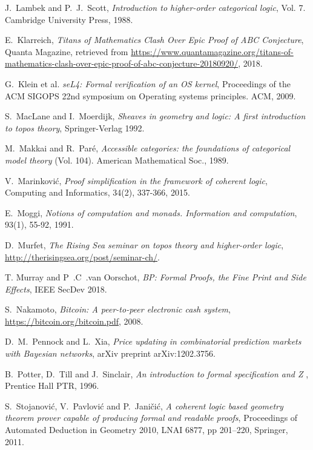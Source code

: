 \documentclass[english,letter paper,12pt,reqno]{article}
\theoremstyle{example}
\begin{document}
\begin{thebibliography}{BHLS03}
J.~Lambek and P.~J.~Scott, \textsl{Introduction to higher-order categorical logic}, Vol. 7. Cambridge University Press, 1988.

E.~Klarreich, \textsl{Titans of Mathematics Clash Over Epic Proof of ABC Conjecture}, Quanta Magazine, retrieved from \href{https://www.quantamagazine.org/titans-of-mathematics-clash-over-epic-proof-of-abc-conjecture-20180920/}{https://www.quantamagazine.org/titans-of-mathematics-clash-over-epic-proof-of-abc-conjecture-20180920/}, 2018.

G.~Klein et al. \textsl{seL4: Formal verification of an OS kernel}, Proceedings of the ACM SIGOPS 22nd symposium on Operating systems principles. ACM, 2009.

S.~MacLane and I.~Moerdijk, \textsl{Sheaves in geometry and logic: A first introduction to topos theory}, Springer-Verlag 1992.

M.~Makkai and R.~Par\'{e}, \textsl{Accessible categories: the foundations of categorical model theory} (Vol. 104). American Mathematical Soc., 1989.

V.~Marinkovi\'{c}, \textsl{Proof simplification in the framework of coherent logic}, Computing and Informatics, 34(2), 337-366, 2015.

E.~Moggi, \textsl{Notions of computation and monads. Information and computation}, 93(1), 55-92, 1991.

D.~Murfet, \textsl{The Rising Sea seminar on topos theory and higher-order logic}, \href{http://therisingsea.org/post/seminar-ch/}{http://therisingsea.org/post/seminar-ch/}.

T. Murray and P~.C~.van Oorschot, \textsl{BP: Formal Proofs, the Fine Print and Side Effects}, IEEE SecDev 2018.

S.~Nakamoto, \textsl{Bitcoin: A peer-to-peer electronic cash system}, \href{https://bitcoin.org/bitcoin.pdf}{https://bitcoin.org/bitcoin.pdf}, 2008.

D.~M.~Pennock and L.~Xia, \textsl{Price updating in combinatorial prediction markets with Bayesian networks}, arXiv preprint arXiv:1202.3756.

B.~Potter, D.~Till and J.~Sinclair, \textsl{An introduction to formal specification and Z
}, Prentice Hall PTR, 1996.

S.~Stojanovi\'{c}, V.~Pavlovi\'{c} and P.~Jani\v{c}i\'{c}, \textsl{A coherent logic based geometry theorem prover capable of producing formal and readable proofs}, Proceedings of Automated Deduction in Geometry 2010, LNAI 6877, pp 201–220, Springer, 2011.


\end{thebibliography}
\end{document}
